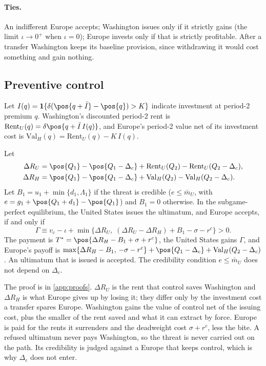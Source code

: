 \paragraph{Ties.} An indifferent Europe accepts; Washington issues only if it strictly gains (the limit $\iota\to 0^{+}$ when $\iota=0$); Europe invests only if that is strictly profitable. After a transfer Washington keeps its baseline provision, since withdrawing it would cost something and gain nothing.

\subsection{Preventive control}\label{sec:preventive}

Let $I(q)=\mathbf 1\{\delta(\pos{q+\bar I}-\pos{q})>K\}$ indicate investment at period-2 premium $q$. Washington's discounted period-2 rent is $\mathrm{Rent}_U(q)=\delta\pos{q+\bar I\,I(q)}$, and Europe's period-2 value net of its investment cost is $\mathrm{Val}_H(q)=\mathrm{Rent}_U(q)-K\,I(q)$.

\begin{proposition}\label{prop:control}
Let
\begin{align*}
\Delta R_U&=\pos{Q_1}-\pos{Q_1-\Delta_c}+\mathrm{Rent}_U(Q_2)-\mathrm{Rent}_U(Q_2-\Delta_c),\\
\Delta R_H&=\pos{Q_1}-\pos{Q_1-\Delta_c}+\mathrm{Val}_H(Q_2)-\mathrm{Val}_H(Q_2-\Delta_c).
\end{align*}
Let $B_1=u_1+\min\{d_1,\Lambda_1\}$ if the threat is credible ($e\le\bar m_U$, with $e=g_1+\pos{Q_1+d_1}-\pos{Q_1}$) and $B_1=0$ otherwise. In the subgame-perfect equilibrium, the United States issues the ultimatum, and Europe accepts, if and only if
\begin{equation*}
\Gamma\equiv v_c-\iota+\min\{\Delta R_U,\;(\Delta R_U-\Delta R_H)+B_1-\sigma-r^c\}>0 .
\end{equation*}
The payment is $T^*=\pos{\Delta R_H-B_1+\sigma+r^c}$, the United States gains $\Gamma$, and Europe's payoff is
$\max\{\Delta R_H-B_1,\,-\sigma-r^c\}+\pos{Q_1-\Delta_c}+\mathrm{Val}_H(Q_2-\Delta_c)$.
An ultimatum that is issued is accepted. The credibility condition $e\le\bar m_U$ does not depend on $\Delta_c$.
\end{proposition}

The proof is in \cref{app:proofs}. $\Delta R_U$ is the rent that control saves Washington and $\Delta R_H$ is what Europe gives up by losing it; they differ only by the investment cost a transfer spares Europe. Washington gains the value of control net of the issuing cost, plus the smaller of the rent saved and what it can extract by force. Europe is paid for the rents it surrenders and the deadweight cost $\sigma+r^c$, less the bite. A refused ultimatum never pays Washington, so the threat is never carried out on the path. Its credibility is judged against a Europe that keeps control, which is why $\Delta_c$ does not enter.

